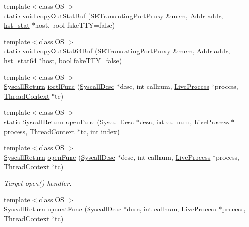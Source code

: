 \begin{DoxyCompactItemize}
\item 
{\footnotesize template$<$class OS $>$ }\\static void \hyperlink{syscall__emul_8hh_aad05317c6d15ac782ba87a36452232d6}{copyOutStatBuf} (\hyperlink{classSETranslatingPortProxy}{SETranslatingPortProxy} \&mem, \hyperlink{base_2types_8hh_af1bb03d6a4ee096394a6749f0a169232}{Addr} addr, \hyperlink{syscall__emul_8hh_a4385fa83cd626df796c087776dd3eaa7}{hst\_\-stat} $\ast$host, bool fakeTTY=false)
\item 
{\footnotesize template$<$class OS $>$ }\\static void \hyperlink{syscall__emul_8hh_a19c436e0b01699972a23c7d7abba0f05}{copyOutStat64Buf} (\hyperlink{classSETranslatingPortProxy}{SETranslatingPortProxy} \&mem, \hyperlink{base_2types_8hh_af1bb03d6a4ee096394a6749f0a169232}{Addr} addr, \hyperlink{syscall__emul_8hh_aa03f86fa4319b8ebc18a00641cf30543}{hst\_\-stat64} $\ast$host, bool fakeTTY=false)
\item 
{\footnotesize template$<$class OS $>$ }\\\hyperlink{classSyscallReturn}{SyscallReturn} \hyperlink{syscall__emul_8hh_af6b366bfb30ebd76fe4647b2c29c94cf}{ioctlFunc} (\hyperlink{classSyscallDesc}{SyscallDesc} $\ast$desc, int callnum, \hyperlink{classLiveProcess}{LiveProcess} $\ast$process, \hyperlink{classThreadContext}{ThreadContext} $\ast$tc)
\item 
{\footnotesize template$<$class OS $>$ }\\static \hyperlink{classSyscallReturn}{SyscallReturn} \hyperlink{syscall__emul_8hh_ae8b330340cfb5e878941b80c190e1bcb}{openFunc} (\hyperlink{classSyscallDesc}{SyscallDesc} $\ast$desc, int callnum, \hyperlink{classLiveProcess}{LiveProcess} $\ast$process, \hyperlink{classThreadContext}{ThreadContext} $\ast$tc, int index)
\item 
{\footnotesize template$<$class OS $>$ }\\\hyperlink{classSyscallReturn}{SyscallReturn} \hyperlink{syscall__emul_8hh_aee9c33e8ab3dbe5b14af21d403675465}{openFunc} (\hyperlink{classSyscallDesc}{SyscallDesc} $\ast$desc, int callnum, \hyperlink{classLiveProcess}{LiveProcess} $\ast$process, \hyperlink{classThreadContext}{ThreadContext} $\ast$tc)
\begin{DoxyCompactList}\small\item\em Target open() handler. \item\end{DoxyCompactList}\item 
{\footnotesize template$<$class OS $>$ }\\\hyperlink{classSyscallReturn}{SyscallReturn} \hyperlink{syscall__emul_8hh_a796691a0efbcbad98107fe763c22083b}{openatFunc} (\hyperlink{classSyscallDesc}{SyscallDesc} $\ast$desc, int callnum, \hyperlink{classLiveProcess}{LiveProcess} $\ast$process, \hyperlink{classThreadContext}{ThreadContext} $\ast$tc)

\end{DoxyCompactItemize}
